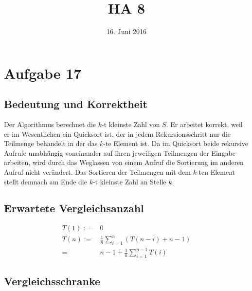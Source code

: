 



\title{HA 8}
\date{16. Juni 2016}

\maketitle

\section*{Aufgabe 17}
\label{sec:Aufgabe 17}

\subsection{Bedeutung und Korrektheit}
\label{sub:Bedeutung und Korrektheit}

Der Algorithmus berechnet die $k$-t kleinste Zahl von $S$. Er arbeitet korrekt, weil er im Wesentlichen ein Quicksort ist, der in jedem Rekursionsschritt nur die Teilmenge behandelt in der das $k$-te Element ist. Da im Quicksort beide rekursive Aufrufe unabhängig voneinander auf ihren jeweiligen Teilmengen der Eingabe arbeiten, wird durch das Weglassen von einem Aufruf die Sortierung im anderen Aufruf nicht verändert. Das Sortieren der Teilmengen mit dem $k$-ten Element stellt demnach am Ende die $k$-t kleinste Zahl an Stelle $k$.

\subsection{Erwartete Vergleichsanzahl}
\label{sub:Erwartete Vergleichsanzahl}

\begin{align*}
	T(1) :=&\ 0 \\
	T(n) :=&\ \frac{1}{n} \sum_{i = 1}^{n} (T(n - i) + n - 1) \\
	=&\ n - 1 + \frac{1}{n} \sum_{i = 1}^{n - 1} T(i)
\end{align*}

\subsection{Vergleichsschranke}
\label{sub:Vergleichsschranke}


